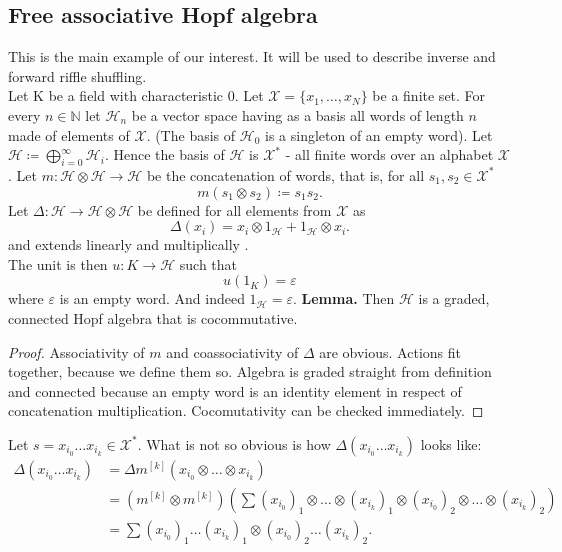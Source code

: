 \documentclass[a4paper, 12pt]{report}
\begin{document}
\subsection{Free associative Hopf algebra}
This is the main example of our interest. It will be used to describe inverse and forward riffle shuffling.\\
Let K be a field with characteristic 0.
Let $\mathcal{X} = \{x_1, \dots, x_N\}$ be a finite set. For every $n \in \mathbb{N}$ let
$\mathcal{H}_n$ be a vector space having as a basis all words of length $n$ made of elements
of $\mathcal{X}$. (The basis of $\mathcal{H}_0$ is a singleton of an empty word).
Let $\mathcal{H} \coloneqq \displaystyle\bigoplus^{\infty}_{i = 0} \mathcal{H}_i$. Hence
the basis of $\mathcal{H}$ is $\mathcal{X}^*$ - all finite words over an alphabet $\mathcal{X}$.
Let $m : \mathcal{H} \otimes \mathcal{H} \to \mathcal{H}$ be the concatenation of words,
that is, for all $s_1, s_2 \in \mathcal{X}^*$
\begin{equation*}
m(s_1 \otimes s_2) \coloneqq s_1s_2.
\end{equation*}
Let $\Delta : \mathcal{H} \to \mathcal{H} \otimes \mathcal{H}$ be defined for all elements from
$\mathcal{X}$ as
\begin{equation*}
\Delta(x_i) = x_i \otimes 1_\mathcal{H} + 1_\mathcal{H} \otimes x_i.
\end{equation*}
and extends linearly and multiplically .\\
The unit is then $u : K \to \mathcal{H}$ such that
\begin{equation*}
u(1_K) = \varepsilon
\end{equation*}
where $\varepsilon$ is an empty word. And indeed $1_\mathcal{H} = \varepsilon$.
\textbf{Lemma. } Then $\mathcal{H}$ is a graded, connected Hopf algebra that is cocommutative.
\begin{proof}
Associativity of $m$ and coassociativity of $\Delta$ are obvious. Actions fit together,
because we define them so. Algebra is graded straight from definition and connected because an empty word
is an identity element in respect of concatenation multiplication. Cocomutativity can be checked immediately.
\end{proof}
\noindent Let $s = x_{i_0}\dots x_{i_k} \in \mathcal{X}^*$. What is not so obvious is
how $\Delta(x_{i_0}\dots x_{i_k})$ looks like:
\begin{align}
\Delta(x_{i_0}\dots x_{i_k}) &= \Delta m^{[k]}(x_{i_0} \otimes \dots \otimes x_{i_k}) \\
&= (m^{[k]} \otimes m^{[k]}) \left(\sum (x_{i_0})_1 \otimes \dots \otimes (x_{i_k})_1 \otimes
(x_{i_0})_2 \otimes \dots \otimes (x_{i_k})_2\right) \\
&= \sum (x_{i_0})_1 \dots (x_{i_k})_1 \otimes
(x_{i_0})_2 \dots (x_{i_k})_2.
\end{align}
\end{document}
